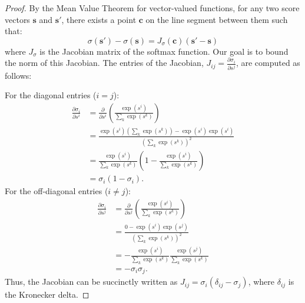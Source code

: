 \begin{proof}
By the Mean Value Theorem for vector-valued functions, for any two score vectors \( \mathbf{s} \) and \( \mathbf{s}' \), there exists a point \( \mathbf{c} \) on the line segment between them such that:
\[
\sigma(\mathbf{s}') - \sigma(\mathbf{s}) = J_{\sigma}(\mathbf{c}) (\mathbf{s}' - \mathbf{s})
\]
where \( J_{\sigma} \) is the Jacobian matrix of the softmax function. Our goal is to bound the norm of this Jacobian. The entries of the Jacobian, \( J_{ij} = \frac{\partial \sigma_i}{\partial s^j} \), are computed as follows:

For the diagonal entries (\(i = j\)):
\begin{align*}
    \frac{\partial \sigma_i}{\partial s^i} &= \frac{\partial}{\partial s^i} \left( \frac{\exp(s^i)}{\sum_k \exp(s^k)} \right) \\
    &= \frac{\exp(s^i) \left(\sum_k \exp(s^k)\right) - \exp(s^i) \exp(s^i)}{(\sum_k \exp(s^k))^2} \\
    &= \frac{\exp(s^i)}{\sum_k \exp(s^k)} \left( 1 - \frac{\exp(s^i)}{\sum_k \exp(s^k)} \right) \\
    &= \sigma_i (1 - \sigma_i).
\end{align*}
For the off-diagonal entries (\(i \neq j\)):
\begin{align*}
    \frac{\partial \sigma_i}{\partial s^j} &= \frac{\partial}{\partial s^j} \left( \frac{\exp(s^i)}{\sum_k \exp(s^k)} \right) \\
    &= \frac{0 - \exp(s^i) \exp(s^j)}{(\sum_k \exp(s^k))^2} \\
    &= - \frac{\exp(s^i)}{\sum_k \exp(s^k)} \frac{\exp(s^j)}{\sum_k \exp(s^k)} \\ 
    &= -\sigma_i \sigma_j.
\end{align*}
Thus, the Jacobian can be succinctly written as \( J_{ij} = \sigma_i (\delta_{ij} - \sigma_j) \), where \( \delta_{ij} \) is the Kronecker delta.


\end{proof}

